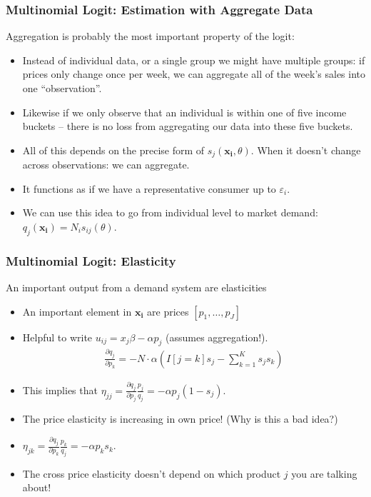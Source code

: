 \documentclass[xcolor=pdftex,dvipsnames,table,mathserif]{beamer}
\begin{document}
\begin{frame}
\frametitle{Multinomial Logit: Estimation with Aggregate Data}
\alert{Aggregation} is probably the most important property of the  logit:
\begin{itemize}
\item Instead of individual data, or a single group we might have multiple groups: if prices only change once per week, we can aggregate all of the week's sales into one ``observation''.
\item Likewise if we only observe that an individual is within one of five income buckets -- there is no loss from aggregating our data into these five buckets.
\item All of this depends on the precise form of $ s_{j}(\mathbf{x_i},\theta)$. When it doesn't change across observations: we can aggregate.
\item It functions as if we have a representative consumer up to $\varepsilon_{i}$.
\item We can use this idea to go from individual level to market demand: $q_j(\mathbf{x_i}) = N_i s_{ij}(\theta)$.
\end{itemize}
\end{frame}

\begin{frame}
\frametitle{Multinomial Logit: Elasticity}
An important output from a demand system are elasticities
\begin{itemize}
\item An important element in $\mathbf{x_i}$ are prices $[p_{1},\ldots,p_J]$
\item Helpful to write $u_{ij} = x_j \beta -\alpha p_j$ (assumes aggregation!).
\begin{eqnarray*}
\frac{\partial q_j}{\partial p_k} =-N \cdot \alpha \left(I[j = k] s_j -\sum_{k=1}^K s_j s_k \right)
\end{eqnarray*}
\item This implies that $ \eta_{jj} = \frac{\partial q_j}{\partial p_j} \frac{p_j}{q_j}  = -\alpha p_j (1-s_j)$.
\item The price elasticity is increasing in own price! (Why is this a bad idea?)
\item  $ \eta_{jk} = \frac{\partial q_j}{\partial p_k} \frac{p_k}{q_j}  = -\alpha p_k s_k$.
\item The cross price elasticity doesn't depend on which product $j$ you are talking about!
\end{itemize}
\end{frame}
\end{document}

